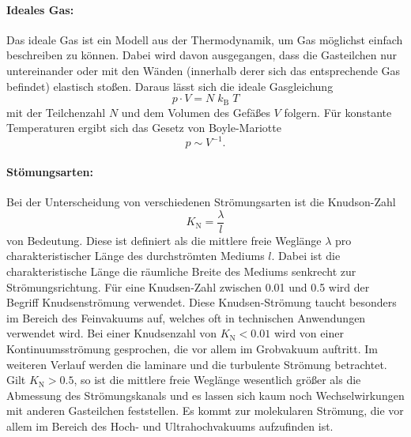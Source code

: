 \paragraph{Ideales Gas:}
Das ideale Gas ist ein Modell aus der Thermodynamik, um Gas möglichst einfach beschreiben zu
können. Dabei wird davon ausgegangen, dass die Gasteilchen nur untereinander oder mit den Wänden
(innerhalb derer sich das entsprechende Gas befindet) elastisch stoßen.
Daraus lässt sich die ideale Gasgleichung
\begin{equation}
  p \cdot V = N \;k_\text{B}\;T
  \label{eqn:ideal}
\end{equation}
mit der Teilchenzahl $N$ und dem Volumen des Gefäßes $V$ folgern.
Für konstante Temperaturen ergibt sich das Gesetz von Boyle-Mariotte
\begin{equation}
  p \sim V^{-1}.
\end{equation}

\paragraph{Stömungsarten:}
Bei der Unterscheidung von verschiedenen Strömungsarten ist die Knudson-Zahl
\begin{equation}
  K_\text{N} = \frac{\lambda}{l}
  \label{eqn:Knudsen}
\end{equation}
von Bedeutung.
Diese ist definiert als die mittlere freie Weglänge $\lambda$ pro charakteristischer Länge des
durchströmten Mediums $l$.
Dabei ist die charakteristische Länge die räumliche Breite des Mediums
senkrecht zur Strömungsrichtung.
Für eine Knudsen-Zahl zwischen \num{0.01} und \num{0.5} wird der Begriff Knudsenströmung verwendet.
Diese Knudsen-Strömung taucht besonders im Bereich des Feinvakuums auf,
welches oft in technischen Anwendungen verwendet wird.
Bei einer Knudsenzahl von $K_\text{N} < \num{0.01}$ wird von einer Kontinuumsströmung gesprochen,
die vor allem im Grobvakuum auftritt.
Im weiteren Verlauf werden die laminare und die turbulente Strömung betrachtet.
Gilt $K_\text{N} > \num{0.5}$, so ist die mittlere freie Weglänge wesentlich größer als die Abmessung des Strömungskanals
und es lassen sich kaum noch Wechselwirkungen mit anderen Gasteilchen feststellen.
Es kommt zur molekularen Strömung,
die vor allem im Bereich des Hoch- und Ultrahochvakuums aufzufinden ist.

